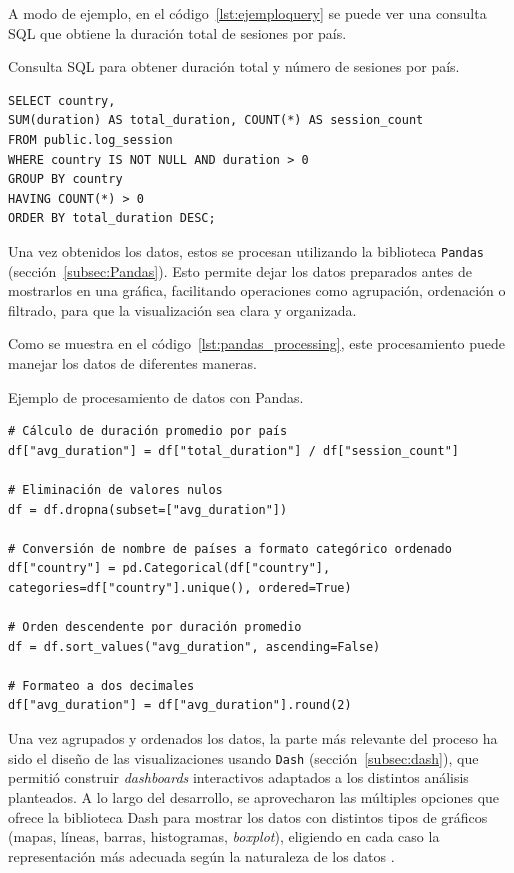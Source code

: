 \documentclass[a4paper, 12pt]{book}
\begin{document}
A modo de ejemplo, en el código~\ref{lst:ejemploquery} se puede ver una consulta SQL que obtiene la duración total de sesiones por país.

\begin{listing}[h!]
\caption{Consulta SQL para obtener duración total y número de sesiones por país.}
\label{lst:ejemploquery}
\begin{verbatim}
SELECT country,
SUM(duration) AS total_duration, COUNT(*) AS session_count
FROM public.log_session
WHERE country IS NOT NULL AND duration > 0
GROUP BY country
HAVING COUNT(*) > 0
ORDER BY total_duration DESC;
\end{verbatim}
\end{listing}

Una vez obtenidos los datos, estos se procesan utilizando la biblioteca \texttt{Pandas} (sección~\ref{subsec:Pandas}). Esto permite dejar los datos preparados antes de mostrarlos en una gráfica, facilitando operaciones como agrupación, ordenación o filtrado, para que la visualización sea clara y organizada.

Como se muestra en el código~\ref{lst:pandas_processing}, este procesamiento puede manejar los datos de diferentes maneras.

\begin{listing}[h!]
\caption{Ejemplo de procesamiento de datos con Pandas.}
\label{lst:pandas_processing}
\begin{verbatim}
# Cálculo de duración promedio por país
df["avg_duration"] = df["total_duration"] / df["session_count"]

# Eliminación de valores nulos
df = df.dropna(subset=["avg_duration"])

# Conversión de nombre de países a formato categórico ordenado
df["country"] = pd.Categorical(df["country"], categories=df["country"].unique(), ordered=True)

# Orden descendente por duración promedio
df = df.sort_values("avg_duration", ascending=False)

# Formateo a dos decimales 
df["avg_duration"] = df["avg_duration"].round(2)
\end{verbatim}
\end{listing}

Una vez agrupados y ordenados los datos, la parte más relevante del proceso ha sido el diseño de las visualizaciones usando \texttt{Dash} (sección~\ref{subsec:dash}), que permitió construir \textit{dashboards} interactivos adaptados a los distintos análisis planteados. A lo largo del desarrollo, se aprovecharon las múltiples opciones que ofrece la biblioteca Dash para mostrar los datos con distintos tipos de gráficos (mapas, líneas, barras, histogramas, \textit{boxplot}), eligiendo en cada caso la representación más adecuada según la naturaleza de los datos \cite{rGraphGallery}.
\end{document}
